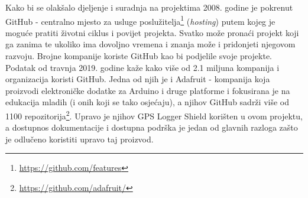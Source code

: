 Kako bi se olakšalo djeljenje i suradnja na projektima 2008. godine je pokrenut GitHub - centralno mjesto za usluge poslužitelja\footnote{\href{https://github.com/features}{https://github.com/features}} (\textit{hosting}) putem kojeg je moguće pratiti životni ciklus i povijet projekta.
Svatko može pronaći projekt koji ga zanima te ukoliko ima dovoljno vremena i znanja može i pridonjeti njegovom razvoju.
Brojne kompanije koriste GitHub kao bi podjelile svoje projekte. Podatak od travnja 2019. godine kaže kako više od 2.1 miljuna kompanija i organizacija koristi GitHub.
Jedna od njih je i Adafruit - kompanija koja proizvodi elektroničke dodatke za Arduino i druge platforme i fokusirana je na edukacija mladih (i onih koji se tako osjećaju), a njihov GitHub sadrži više od 1100 repozitorija\footnote{\href{https://github.com/adafruit}{https://github.com/adafruit/}}.
Upravo je njihov GPS Logger Shield korišten u ovom projektu, a dostupnos dokumentacije i dostupna podrška je jedan od glavnih razloga zašto je odlučeno koristiti upravo taj proizvod.

